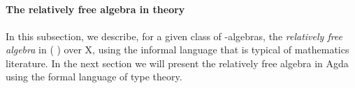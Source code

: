\begin{code}%
\>[0]\<%
\\
%
\>[1]\AgdaSpace{}%
\AgdaSymbol{:}\AgdaSpace{}%
\AgdaSymbol{(}\AgdaSpace{}%
\AgdaSymbol{:}\AgdaSpace{}%
\AgdaSpace{}%
\AgdaSpace{}%
\AgdaOperator{\AgdaFunction{𝕌[}}\AgdaSpace{}%
\AgdaSpace{}%
\AgdaOperator{\AgdaFunction{]}}\AgdaSymbol{)(}\AgdaSpace{}%
\AgdaSymbol{:}\AgdaSpace{}%
\AgdaSpace{}%
\AgdaSymbol{)}\AgdaSpace{}%
\AgdaSpace{}%
\AgdaSpace{}%
\AgdaSpace{}%
\AgdaSpace{}%
\AgdaSpace{}%
\AgdaSpace{}%
\AgdaSpace{}%
\AgdaSymbol{(}\AgdaSymbol{\{}\AgdaSpace{}%
\AgdaSymbol{=}\AgdaSpace{}%
\AgdaSymbol{\}}\AgdaSpace{}%
\AgdaSymbol{)}\AgdaSpace{}%
\<%
\\
%
\>[1]\AgdaSpace{}%
\AgdaSpace{}%
\AgdaSymbol{(}\AgdaSpace{}%
\AgdaSymbol{)}%
\>[32]\AgdaSymbol{=}\AgdaSpace{}%
\<%
\\
%
\>[1]\AgdaSpace{}%
\AgdaSpace{}%
\AgdaSymbol{(}\AgdaSpace{}%
\AgdaSpace{}%
\AgdaSymbol{)}%
\>[32]\AgdaSymbol{=}\AgdaSpace{}%
\AgdaSpace{}%
\AgdaSymbol{(}\AgdaSpace{}%
\AgdaSymbol{)}\AgdaSpace{}%
\AgdaSymbol{(}\AgdaSpace{}%
\AgdaOperator{\AgdaInductiveConstructor{,}}\AgdaSpace{}%
\AgdaSymbol{(}\AgdaSpace{}%
\AgdaSymbol{)}\AgdaSpace{}%
\AgdaSpace{}%
\AgdaSymbol{)}\<%
\end{code}

\paragraph*{The relatively free algebra in theory}
In this subsection, we describe, for a given class  of -algebras, the
\emph{relatively free algebra} in  ( ) over \ab X, using the informal
language that is typical of mathematics literature. In the next section we will present
the relatively free algebra in Agda using the formal language of type theory.


